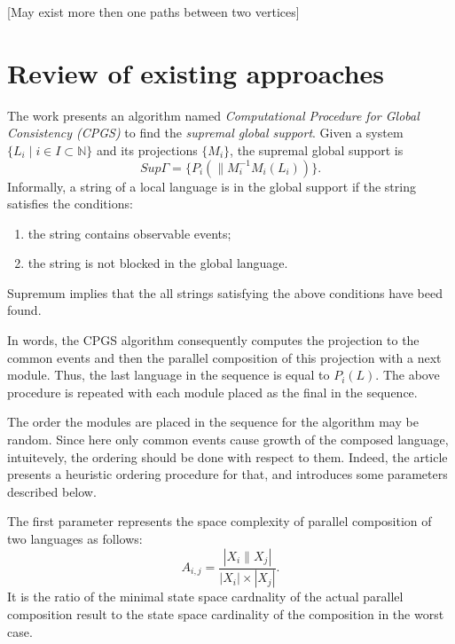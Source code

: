\documentclass[a4paper, 10pt, conference]{ieeeconf}
\begin{document}
[May exist more then one paths between two vertices]  

\section{Review of existing approaches}

The work \cite{su_global_2005} presents an algorithm named \emph{Computational
Procedure for Global Consistency (CPGS)} to find the \emph{supremal
global support}. Given a system 
$\{ L_i \mid i \in I \subset \mathbb{N} \}$ 
and its projections $\{ M_i \}$, the supremal global support is
\begin{equation}
	Sup\Gamma = \{ P_i(\parallel M_i^{-1}M_i(L_i))\}.
\end{equation}
Informally, a string of a local language is in the global support if the string
satisfies the conditions:
\begin{enumerate}
  \item the string contains observable events;
  \item the string is not blocked in the global language. 
\end{enumerate}
Supremum implies that the all strings satisfying the above conditions have
beed found.

In words, the CPGS algorithm consequently computes the projection to the common
events and then the parallel composition of this projection with a next module.
Thus, the last language in the sequence is equal to $P_i(L)$. The above
procedure is repeated with each module placed as the final in the sequence.

The order the modules are placed in the sequence for the algorithm may be
random. Since here only common events cause growth of the composed language,
intuitevely, the ordering should be done with respect to them. Indeed, the
article presents a heuristic ordering procedure for that, and introduces some
parameters described below.

The first parameter represents the space complexity of parallel composition of
two languages as follows:
\begin{equation}
	A_{i,j} = \frac{| X_i \parallel X_j |}{|X_i|\times |X_j|}.
\end{equation}
It is the ratio of the minimal state space cardnality of the actual parallel
composition result to the state space cardinality of the composition in the
worst case.
\end{document}
